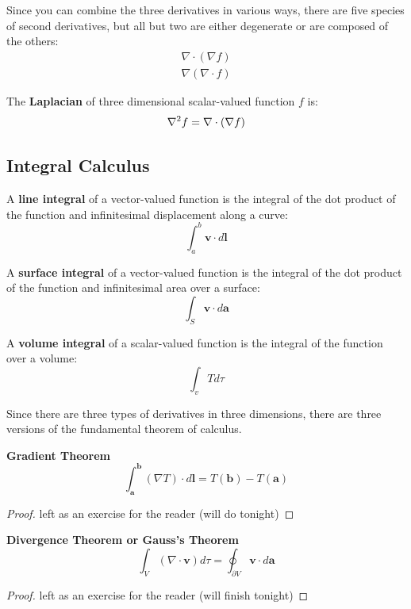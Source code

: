 \documentclass{article}
\begin{document}
Since you can combine the three derivatives in various ways, there are five species of second derivatives, but all but two are either degenerate or are composed of the others:
\begin{align*}
    \nabla \cdot (\nabla f) \\
    \nabla (\nabla \cdot f)
\end{align*}

\begin{definition}
    The \textbf{Laplacian} of three dimensional scalar-valued function \(f\) is:
    \[
        \laplacian{f}=\nabla \cdot (\nabla f)
    \] 
\end{definition}

\subsection{Integral Calculus}
\begin{definition}
    A \textbf{line integral} of a vector-valued function is the integral of the dot product of the function and infinitesimal displacement along a curve:
    \[
        \int_a^b \mathbf{v} \cdot d \mathbf{l} 
    \]
\end{definition}

\begin{definition}
    A \textbf{surface integral} of a vector-valued function is the integral of the dot product of the function and infinitesimal area over a surface:
    \[
        \int_S \mathbf{v} \cdot d \mathbf{a} 
    \]
\end{definition}

\begin{definition}
    A \textbf{volume integral} of a scalar-valued function is the integral of the function over a volume:
    \[
        \int_v T d\tau
    \]
\end{definition}

Since there are three types of derivatives in three dimensions, there are three versions of the fundamental theorem of calculus.

\begin{theorem}{\textbf{Gradient Theorem}}
    \[
        \int_ \mathbf{a} ^ \mathbf{b}  (\nabla T)\cdot d \mathbf{l} =T(\mathbf{b} )-T(\mathbf{a} )
    \] 
\end{theorem}
\begin{proof}
    left as an exercise for the reader (will do tonight)
\end{proof}

\begin{theorem}{\textbf{Divergence Theorem or Gauss's Theorem}}
    \[
        \int_V (\nabla \cdot \mathbf{v}) d\tau=\oint_{\partial V} \mathbf{v}\cdot d \mathbf{a}
    \]
\end{theorem}
\begin{proof}
    left as an exercise for the reader (will finish tonight)
\end{proof}
\end{document}
